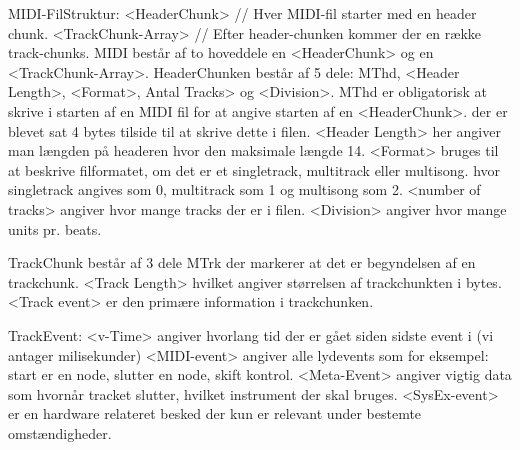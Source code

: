 MIDI-FilStruktur:             
<HeaderChunk>                   // Hver MIDI-fil starter med en header chunk.
<TrackChunk-Array>              // Efter header-chunken kommer der en række track-chunks.
MIDI består af to hoveddele en <HeaderChunk>  og en <TrackChunk-Array>.
HeaderChunken består af 5 dele: MThd, <Header Length>, <Format>, Antal Tracks> og <Division>.
MThd er obligatorisk at skrive i starten af en MIDI fil for at angive starten af en <HeaderChunk>. der er blevet sat 4 bytes tilside til at skrive dette i filen. 
<Header Length> her angiver man længden på headeren hvor den maksimale længde 14.
<Format> bruges til at beskrive filformatet, om det er et singletrack, multitrack eller multisong. hvor singletrack angives som 0, multitrack som 1 og multisong som 2.
<number of tracks> angiver hvor mange tracks der er i filen.   
<Division> angiver hvor mange units pr. beats.

TrackChunk består af 3 dele MTrk der markerer at det er begyndelsen af en trackchunk. <Track Length> hvilket angiver størrelsen af trackchunkten i bytes.
<Track event> er den primære information i trackchunken.
                                
TrackEvent:	            
<v-Time> angiver hvorlang tid der er gået siden sidste event i (vi antager milisekunder)
<MIDI-event> angiver alle lydevents som for eksempel: start er en node, slutter en node, skift kontrol.
<Meta-Event> angiver vigtig data som hvornår tracket slutter, hvilket instrument der skal bruges.
<SysEx-event> er en hardware relateret besked der kun er relevant under bestemte omstændigheder.
